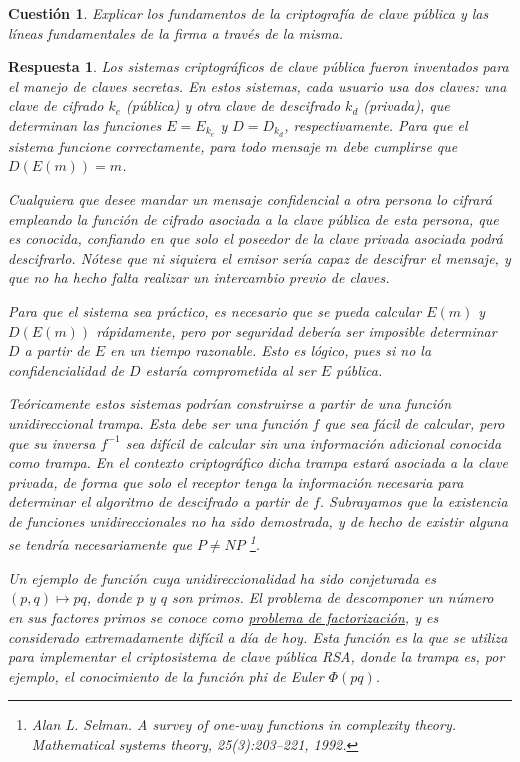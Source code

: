 \documentclass[
  a4paper,
  spanish,
  12pt,
]{scrartcl}
\theoremstyle{ejercicio-style}
\newtheorem{ejer}{Cuestión}
\theoremstyle{remark-style}
\newtheorem*{sol}{Respuesta}
\theoremstyle{teorema-style}
\begin{document}
\begin{ejer}
  Explicar los fundamentos de la criptografía de clave pública y las líneas fundamentales de la firma a través de la misma.
\end{ejer}
\begin{sol}

  Los sistemas criptográficos de clave pública fueron inventados para el manejo de claves secretas. En estos sistemas, cada usuario usa dos claves: una clave de cifrado $k_e$ (pública) y otra clave de descifrado $k_d$ (privada), que determinan las funciones $E = E_{k_e}$ y $D = D_{k_d}$, respectivamente. Para que el sistema funcione correctamente, para todo mensaje $m$ debe cumplirse que $D(E(m)) = m$.

  Cualquiera que desee mandar un mensaje confidencial a otra persona lo cifrará empleando la función de cifrado asociada a la clave pública de esta persona, que es conocida, confiando en que solo el poseedor de la clave privada asociada podrá descifrarlo. Nótese que ni siquiera el emisor sería capaz de descifrar el mensaje, y que no ha hecho falta realizar un intercambio previo de claves.

  Para que el sistema sea práctico, es necesario que se pueda calcular $E(m)$ y $D(E(m))$ rápidamente, pero por seguridad debería ser imposible determinar $D$ a partir de $E$ en un tiempo razonable. Esto es lógico, pues si no la confidencialidad de $D$ estaría comprometida al ser $E$ pública.

  Teóricamente estos sistemas podrían construirse a partir de una \textit{función unidireccional trampa}. Esta debe ser una función $f$ que sea \emph{fácil} de calcular, pero que su inversa $f^{-1}$ sea \emph{difícil} de calcular sin una información adicional conocida como \textit{trampa}. En el contexto criptográfico dicha trampa estará asociada a la clave privada, de forma que solo el receptor tenga la información necesaria para determinar el algoritmo de descifrado a partir de $f$. Subrayamos que la existencia de funciones unidireccionales no ha sido demostrada, y de hecho de existir alguna se tendría necesariamente que $P \neq NP$ \footnote{Alan L. Selman. \textit{A survey of one-way functions in complexity theory}. Mathematical systems theory, 25(3):203–221, 1992.}.

  Un ejemplo de función cuya unidireccionalidad ha sido conjeturada es $(p, q) \mapsto pq$, donde $p$ y $q$ son primos. El problema de descomponer un número en sus factores primos se conoce como \href{https://en.wikipedia.org/wiki/Integer_factorization}{problema de factorización}, y es considerado extremadamente difícil a día de hoy. Esta función es la que se utiliza para implementar el criptosistema de clave pública RSA, donde la trampa es, por ejemplo, el conocimiento de la \textit{función phi de Euler} $\Phi(pq)$.


\end{sol}
\end{document}
